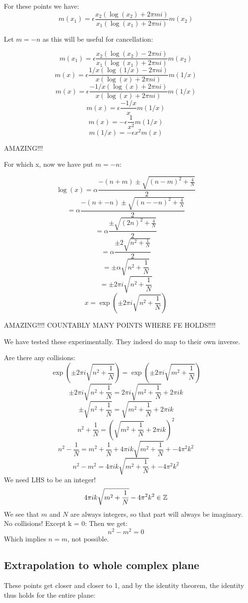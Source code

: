 \documentclass[a4paper]{amsart}
\begin{document}
For these points we have:
$$m(x_1) = \epsilon\frac{x_2(\log(x_2) + 2\pi m i)}{x_1(\log(x_1) + 2\pi n i)}m(x_2)$$


Let $m = -n$ as this will be useful for cancellation:

$$m(x_1) = \epsilon\frac{x_2(\log(x_2) - 2\pi n i)}{x_1(\log(x_1) + 2\pi n i)}m(x_2)$$
$$m(x) = \epsilon\frac{1/x(\log(1/x) - 2\pi n i)}{x(\log(x) + 2\pi n i)}m(1/x)$$
$$m(x) = \epsilon\frac{-1/x(\log(x) + 2\pi n i)}{x(\log(x) + 2\pi n i)}m(1/x)$$
$$m(x) = \epsilon\frac{-1/x}{x}m(1/x)$$
$$m(x) = -\epsilon\frac{1}{x^2}m(1/x)$$
$$m(1/x) = -\epsilon x^2m(x)$$


AMAZING!!!

For which x, now we have put $m = -n$:

$$\log(x) = \alpha\frac{-(n + m) \pm \sqrt{(n - m)^2 + \frac{4}{N}}}{2}$$
$$ = \alpha\frac{-(n + -n) \pm \sqrt{(n - -n)^2 + \frac{4}{N}}}{2}$$
$$ = \alpha\frac{\pm \sqrt{(2n)^2 + \frac{4}{N}}}{2}$$
$$ = \alpha\frac{\pm 2\sqrt{n^2 + \frac{1}{N}}}{2}$$
$$ = \pm \alpha\sqrt{n^2 + \frac{1}{N}}$$
$$ = \pm 2\pi i\sqrt{n^2 + \frac{1}{N}}$$
$$x = \exp(\pm 2\pi i\sqrt{n^2 + \frac{1}{N}})$$


AMAZING!!!! COUNTABLY MANY POINTS WHERE FE HOLDS!!!!

We have tested these experimentally. They indeed do map to their own inverse.

Are there any collisions:
$$\exp(\pm 2\pi i\sqrt{n^2 + \frac{1}{N}}) = \exp(\pm 2\pi i\sqrt{m^2 + \frac{1}{N}})$$
$$\pm 2\pi i\sqrt{n^2 + \frac{1}{N}} = 2\pi i\sqrt{m^2 + \frac{1}{N}} + 2\pi i k$$
$$\pm \sqrt{n^2 + \frac{1}{N}} = \sqrt{m^2 + \frac{1}{N}} + 2\pi i k$$
$$n^2 + \frac{1}{N} = (\sqrt{m^2 + \frac{1}{N}} + 2\pi i k)^2$$
$$n^2 - \frac{1}{N} = m^2 + \frac{1}{N} + 4\pi i k\sqrt{m^2 + \frac{1}{N}} + -4\pi^2k^2$$
$$n^2 - m^2 = 4\pi i k\sqrt{m^2 + \frac{1}{N}} + -4\pi^2k^2$$
We need LHS to be an integer!
$$4\pi i k\sqrt{m^2 + \frac{1}{N}} - 4\pi^2k^2 \in \mathbb{Z}$$
We see that $m$ and $N$ are always integers, so that part will always be imaginary. No collisions! Except k = 0: Then we get:
$$n^2 - m^2 = 0$$
Which implies $n = m$, not possible.

\subsection{Extrapolation to whole complex plane}

These points get closer and closer to 1, and by the identity theorem, the identity thus holds for the entire plane:
\end{document}
